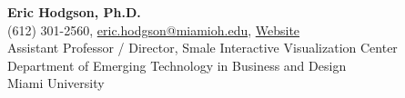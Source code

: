 \textbf{Eric Hodgson, Ph.D.}\\
\hspace*{0.25cm}\faPhone\hspace*{0.1cm}(612) 301-2560,\hspace*{0.2cm} \faEnvelopeO\hspace*{0.1cm}\href{mailto://eric.hodgson@miamioh.edu}{eric.hodgson@miamioh.edu}, \faLink\hspace*{0.1cm}\href{https://www.miamioh.edu/cca/academics/departments/etbd/about/our-people/faculty/eric-hodgson/index.html}{Website}\\
\hspace*{0.25cm} Assistant Professor / Director, Smale Interactive Visualization Center\\
\hspace*{0.25cm} Department of Emerging Technology in Business and Design\\
\hspace*{0.25cm} Miami University\\




\label{references_last}


